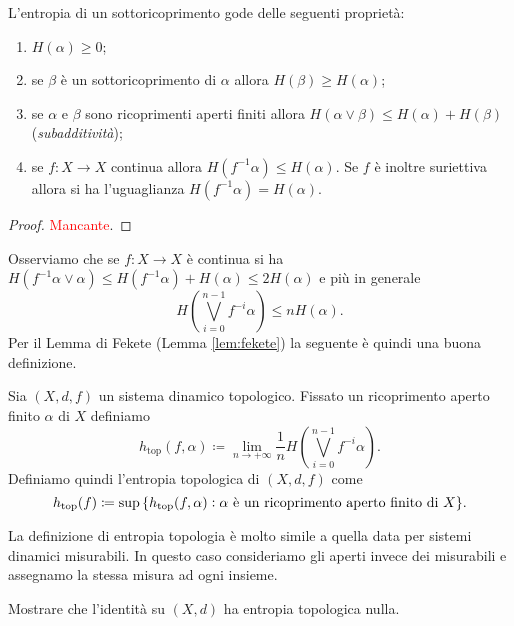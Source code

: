 \begin{lemma}
    L'entropia di un sottoricoprimento gode delle seguenti proprietà:
    \begin{enumerate}[label=(\roman*)]
        \item $ H(\alpha) \geq 0 $;
        \item se $ \beta $ è un sottoricoprimento di $ \alpha $ allora $ H(\beta) \geq H(\alpha) $;
        \item se $ \alpha $ e $ \beta $ sono ricoprimenti aperti finiti allora $ H(\alpha \vee \beta) \leq H(\alpha) + H(\beta) $ (\emph{subadditività});
        \item se $ f \colon X \to X $ continua allora $ H(f^{-1}\alpha) \leq H(\alpha) $. Se $ f $ è inoltre suriettiva allora si ha l'uguaglianza $ H(f^{-1}\alpha) = H(\alpha) $.
    \end{enumerate}
\end{lemma}
\begin{proof}
    \textcolor{red}{Mancante}.
\end{proof}

Osserviamo che se $ f \colon X \to X $ è continua si ha $ H(f^{-1}\alpha \vee \alpha) \leq H(f^{-1}\alpha) + H(\alpha) \leq 2 H(\alpha) $ e più in generale
\[
    H{\left(\bigvee_{i=0}^{n-1}f^{-i}\alpha\right)} \leq n H(\alpha).
\]
Per il Lemma di Fekete (Lemma \ref{lem:fekete}) la seguente è quindi una buona definizione.

\begin{definition}
    Sia $ (X, d, f) $ un sistema dinamico topologico. Fissato un ricoprimento aperto finito $ \alpha $ di $ X $ definiamo
    \[
        h_{\mathrm{top}}(f, \alpha) \coloneqq \lim_{n \to +\infty} \frac{1}{n} H{\left(\textstyle\bigvee_{i=0}^{n-1}f^{-i}\alpha\right)}.
    \]
    Definiamo quindi l'entropia topologica di $ (X, d, f) $ come
    \[
        h_{\mathrm{top}}(f) \coloneqq \sup{\{h_{\mathrm{top}}(f, \alpha) : \text{$ \alpha $ è un ricoprimento aperto finito di $ X $}\}}.
    \]
\end{definition}

La definizione di entropia topologia è molto simile a quella data per sistemi dinamici misurabili. In questo caso consideriamo gli aperti invece dei misurabili e assegnamo la stessa misura ad ogni insieme.

\begin{exercise}
    Mostrare che l'identità su $(X, d) $ ha entropia topologica nulla.
\end{exercise}

